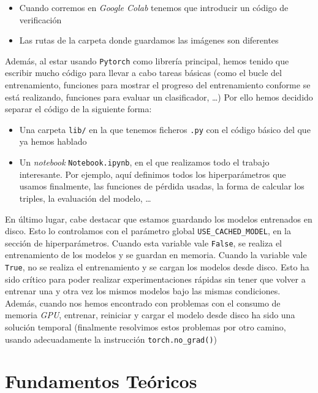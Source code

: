 \documentclass[11pt]{article}
\begin{document}
\begin{itemize}
    \item Cuando corremos en \emph{Google Colab} tenemos que introducir un código de verificación
    \item Las rutas de la carpeta donde guardamos las imágenes son diferentes
\end{itemize}

Además, al estar usando \lstinline{Pytorch} como librería principal, hemos tenido que escribir mucho código para llevar a cabo tareas básicas (como el bucle del entrenamiento, funciones para mostrar el progreso del entrenamiento conforme se está realizando, funciones para evaluar un clasificador, \ldots) Por ello hemos decidido separar el código de la siguiente forma:

\begin{itemize}
  \item Una carpeta \lstinline{lib/} en la que tenemos ficheros \lstinline{.py} con el código básico del que ya hemos hablado
  \item Un \emph{notebook} \lstinline{Notebook.ipynb}, en el que realizamos todo el trabajo interesante. Por ejemplo, aquí definimos todos los hiperparámetros que usamos finalmente, las funciones de pérdida usadas, la forma de calcular los triples, la evaluación del modelo, \ldots
\end{itemize}

En último lugar, cabe destacar que estamos guardando los modelos entrenados en disco. Esto lo controlamos con el parámetro global \lstinline{USE_CACHED_MODEL}, en la sección de hiperparámetros. Cuando esta variable vale \lstinline{False}, se realiza el entrenamiento de los modelos y se guardan en memoria. Cuando la variable vale \lstinline{True}, no se realiza el entrenamiento y se cargan los modelos desde disco. Esto ha sido crítico para poder realizar experimentaciones rápidas sin tener que volver a entrenar una y otra vez los mismos modelos bajo las mismas condiciones. Además, cuando nos hemos encontrado con problemas con el consumo de memoria \emph{GPU}, entrenar, reiniciar y cargar el modelo desde disco ha sido una solución temporal (finalmente resolvimos estos problemas por otro camino, usando adecuadamente la instrucción \lstinline{torch.no_grad()})

\pagebreak

\section{Fundamentos Teóricos}
\end{document}
